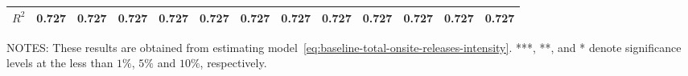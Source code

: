 \begin{table}[H]
{\begin{tabular}{@{}lllllllllllll@{}}
            $R^2$                          & 0.727     & 0.727     & 0.727     & 0.727     & 0.727     & 0.727     & 0.727                & 0.727                & 0.727                & 0.727             & 0.727             & 0.727             \\ \bottomrule \bottomrule
        \end{tabular}%
    }
    \begin{minipage}{\columnwidth}
        \vspace{0.05in}
        \tiny NOTES: These results are obtained from estimating model~\ref{eq:baseline-total-onsite-releases-intensity}. ***, **, and * denote significance levels at the less than $1\%$, $5\%$ and $10\%$, respectively.
    \end{minipage}
\end{table}